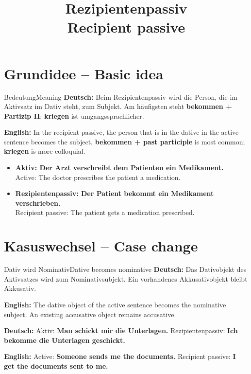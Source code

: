 \documentclass[a4paper,11pt]{article}
\title{Rezipientenpassiv\\[0.3em]\large\textnormal{Recipient passive}}
\date{}
\newcommand{\GermanText}[1]{\textbf{Deutsch: }#1\par}
\newcommand{\EnglishText}[1]{{\small\color{SoftGray}\textbf{English: }#1\par}}
\newcommand{\ExampleItem}[2]{\item \textbf{#1}\\{\small\color{SoftGray}#2}}
\begin{document}
\maketitle
\tableofcontents
\newpage

\section{Grundidee -- Basic idea}
\begin{grammarentry}{Bedeutung}{Meaning}
\GermanText{Beim Rezipientenpassiv wird die Person, die im Aktivsatz im Dativ steht, zum Subjekt. Am häufigsten steht \textbf{bekommen + Partizip II}; \textbf{kriegen} ist umgangssprachlicher.}
\EnglishText{In the recipient passive, the person that is in the dative in the active sentence becomes the subject. \textbf{bekommen + past participle} is most common; \textbf{kriegen} is more colloquial.}
\end{grammarentry}
\begin{exbox}\begin{itemize}
\ExampleItem{Aktiv: Der Arzt verschreibt dem Patienten ein Medikament.}{Active: The doctor prescribes the patient a medication.}
\ExampleItem{Rezipientenpassiv: Der Patient bekommt ein Medikament verschrieben.}{Recipient passive: The patient gets a medication prescribed.}
\end{itemize}\end{exbox}

\section{Kasuswechsel -- Case change}
\begin{grammarentry}{Dativ wird Nominativ}{Dative becomes nominative}
\GermanText{Das Dativobjekt des Aktivsatzes wird zum Nominativsubjekt. Ein vorhandenes Akkusativobjekt bleibt Akkusativ.}
\EnglishText{The dative object of the active sentence becomes the nominative subject. An existing accusative object remains accusative.}
\GermanText{Aktiv: \textbf{Man schickt mir die Unterlagen.} Rezipientenpassiv: \textbf{Ich bekomme die Unterlagen geschickt.}}
\EnglishText{Active: \textbf{Someone sends me the documents.} Recipient passive: \textbf{I get the documents sent to me.}}
\end{grammarentry}
\end{document}
